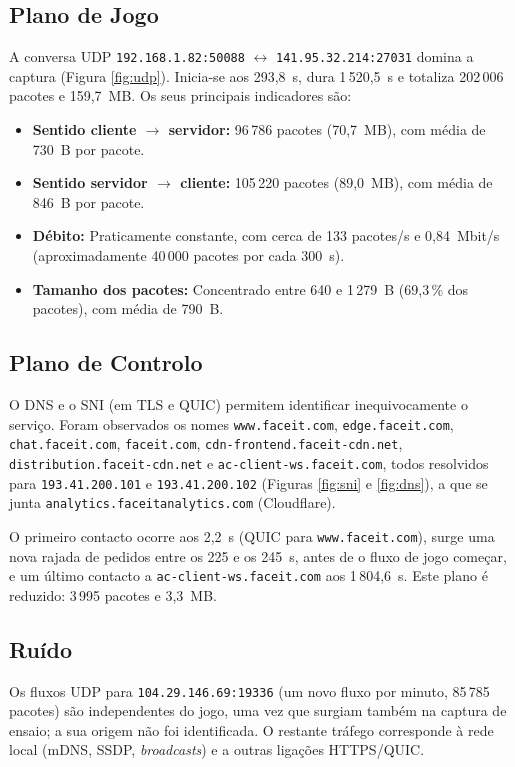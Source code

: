 \documentclass[11pt, a4paper]{article}
\begin{document}
\subsection{Plano de Jogo}
A conversa UDP \texttt{192.168.1.82:50088} $\leftrightarrow$ \texttt{141.95.32.214:27031} domina a captura (Figura \ref{fig:udp}). Inicia-se aos 293,8~s, dura 1\,520,5~s e totaliza 202\,006 pacotes e 159,7~MB. Os seus principais indicadores são:
\begin{itemize}
    \item \textbf{Sentido cliente $\rightarrow$ servidor:} 96\,786 pacotes (70,7~MB), com média de 730~B por pacote.
    \item \textbf{Sentido servidor $\rightarrow$ cliente:} 105\,220 pacotes (89,0~MB), com média de 846~B por pacote.
    \item \textbf{Débito:} Praticamente constante, com cerca de 133 pacotes/s e 0,84~Mbit/s (aproximadamente 40\,000 pacotes por cada 300~s).
    \item \textbf{Tamanho dos pacotes:} Concentrado entre 640 e 1\,279~B (69,3\,\% dos pacotes), com média de 790~B.
\end{itemize}

\subsection{Plano de Controlo}
O DNS e o SNI (em TLS e QUIC) permitem identificar inequivocamente o serviço. Foram observados os nomes \nolinkurl{www.faceit.com}, \nolinkurl{edge.faceit.com}, \nolinkurl{chat.faceit.com}, \nolinkurl{faceit.com}, \nolinkurl{cdn-frontend.faceit-cdn.net}, \nolinkurl{distribution.faceit-cdn.net} e \nolinkurl{ac-client-ws.faceit.com}, todos resolvidos para \texttt{193.41.200.101} e \texttt{193.41.200.102} (Figuras \ref{fig:sni} e \ref{fig:dns}), a que se junta \nolinkurl{analytics.faceitanalytics.com} (Cloudflare).

O primeiro contacto ocorre aos 2,2~s (QUIC para \nolinkurl{www.faceit.com}), surge uma nova rajada de pedidos entre os 225 e os 245~s, antes de o fluxo de jogo começar, e um último contacto a \nolinkurl{ac-client-ws.faceit.com} aos 1\,804,6~s. Este plano é reduzido: 3\,995 pacotes e 3,3~MB.

\subsection{Ruído}
Os fluxos UDP para \texttt{104.29.146.69:19336} (um novo fluxo por minuto, 85\,785 pacotes) são independentes do jogo, uma vez que surgiam também na captura de ensaio; a sua origem não foi identificada. O restante tráfego corresponde à rede local (mDNS, SSDP, \textit{broadcasts}) e a outras ligações HTTPS/QUIC.
\end{document}
